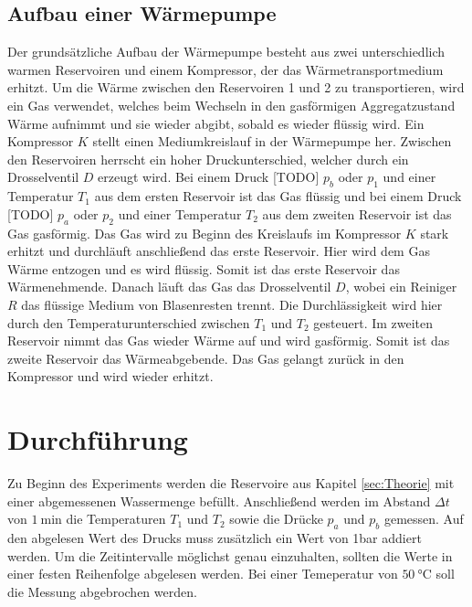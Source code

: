 \subsection{Aufbau einer Wärmepumpe}


    Der grundsätzliche Aufbau der Wärmepumpe besteht aus zwei unterschiedlich warmen Reservoiren und einem Kompressor,
    der das Wärmetransportmedium erhitzt.
    Um die Wärme zwischen den Reservoiren 1 und 2 zu transportieren, wird ein Gas verwendet, welches beim Wechseln in den gasförmigen
    Aggregatzustand Wärme aufnimmt und sie wieder abgibt, sobald es wieder flüssig wird.
    Ein Kompressor $K$ stellt einen Mediumkreislauf in der Wärmepumpe her.
    Zwischen den Reservoiren herrscht ein hoher Druckunterschied, welcher durch ein Drosselventil $D$ erzeugt wird.
    Bei einem Druck [TODO] $p_b$ oder $p_1$ und einer Temperatur $T_1$ aus dem ersten Reservoir ist das Gas flüssig und bei einem Druck [TODO] $p_a$ oder $p_2$
    und einer Temperatur $T_2$ aus dem zweiten Reservoir ist das Gas gasförmig.
    Das Gas wird zu Beginn des Kreislaufs im Kompressor $K$ stark erhitzt und durchläuft anschließend das erste Reservoir.
    Hier wird dem Gas Wärme entzogen und es wird flüssig. Somit ist das erste Reservoir das Wärmenehmende.
    Danach läuft das Gas das Drosselventil $D$, wobei ein Reiniger $R$ das flüssige Medium von Blasenresten trennt.
    Die Durchlässigkeit wird hier durch den Temperaturunterschied zwischen $T_1$ und $T_2$ gesteuert.
    Im zweiten Reservoir nimmt das Gas wieder Wärme auf und wird gasförmig. Somit ist das zweite Reservoir das Wärmeabgebende.
    Das Gas gelangt zurück in den Kompressor und wird wieder erhitzt.


\section{Durchführung} \label{sec:Durchführung}
    Zu Beginn des Experiments werden die Reservoire aus Kapitel \ref{sec:Theorie} mit einer abgemessenen Wassermenge befüllt.
    Anschließend werden im Abstand $\Delta t$ von $\SI{1}{\minute}$ die Temperaturen $T_1$ und $T_2$ sowie die Drücke $p_a$ und $p_b$ gemessen.
    Auf den abgelesen Wert des Drucks muss zusätzlich ein Wert von 1bar addiert werden.
    Um die Zeitintervalle möglichst genau einzuhalten, sollten die Werte in einer festen Reihenfolge abgelesen werden.
    Bei einer Temeperatur von $\SI{50}{\celsius}$ soll die Messung abgebrochen werden.

